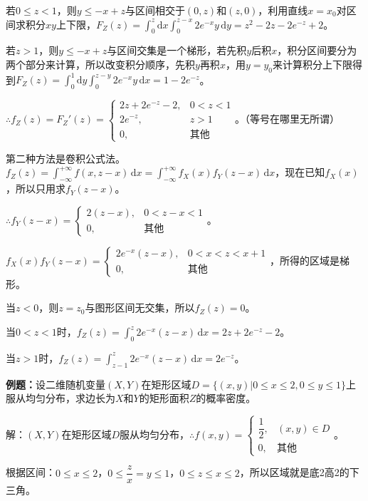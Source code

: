 若$0\leqslant z<1$，则$y\leqslant -x+z$与区间相交于$(0,z)$和$(z,0)$，利用直线$x=x_0$对区间求积分$xy$上下限，$F_Z(z)=\int_0^z\textrm{d}x\int_0^{z-x}2e^{-x}y\,\textrm{d}y=z^2-2z-2e^{-z}+2$。

若$z>1$，则$y\leqslant -x+z$与区间交集是一个梯形，若先积$y$后积$x$，积分区间要分为两个部分来计算，所以改变积分顺序，先积$y$再积$x$，用$y=y_0$来计算积分上下限得到$F_Z(z)=\int_0^1\textrm{d}y\int_0^{z-y}2e^{-x}y\,\textrm{d}x=1-2e^{-z}$。

$\therefore f_Z(z)=F_Z'(z)=\left\{\begin{array}{ll}
    2z+2e^{-z}-2, & 0<z<1 \\
    2e^{-z}, & z>1 \\
    0, & \textbf{其他}
\end{array}\right.$。（等号在哪里无所谓）

第二种方法是卷积公式法。$f_Z(z)=\int_{-\infty}^{+\infty}f(x,z-x)\,\textrm{d}x=\int_{-\infty}^{+\infty}f_X(x)f_Y(z-x)\,\textrm{d}x$，现在已知$f_X(x)$，所以只用求$f_Y(z-x)$。

$\therefore f_Y(z-x)=\left\{\begin{array}{ll}
    2(z-x), & 0<z-x<1 \\
    0, & \textbf{其他}
\end{array}\right.$。

$f_X(x)f_Y(z-x)=\left\{\begin{array}{ll}
    2e^{-x}(z-x), & 0<x<z<x+1 \\
    0, & \text{其他}
\end{array}\right.$，所得的区域是梯形。

当$z<0$，则$z=z_0$与图形区间无交集，所以$f_Z(z)=0$。

当$0<z<1$时，$f_Z(z)=\int_0^z2e^{-x}(z-x)\,\textrm{d}x=2z+2e^{-z}-2$。

当$z>1$时，$f_Z(z)=\int_{z-1}^z2e^{-x}(z-x)\,\textrm{d}x=2e^{-z}$。

\textbf{例题：}设二维随机变量$(X,Y)$在矩形区域$D=\{(x,y)|0\leqslant x\leqslant 2,0\leqslant y\leqslant 1\}$上服从均匀分布，求边长为$X$和$Y$的矩形面积$Z$的概率密度。

解：$(X,Y)$在矩形区域$D$服从均匀分布，$\therefore f(x,y)=\left\{\begin{array}{ll}
    \dfrac{1}{2}, & (x,y)\in D \\
    0, & \text{其他}
\end{array}\right.$。

根据区间：$0\leqslant x\leqslant2$，$0\leqslant\dfrac{z}{x}=y\leqslant1$，$0\leqslant z\leqslant x\leqslant2$，所以区域就是底2高2的下三角。

